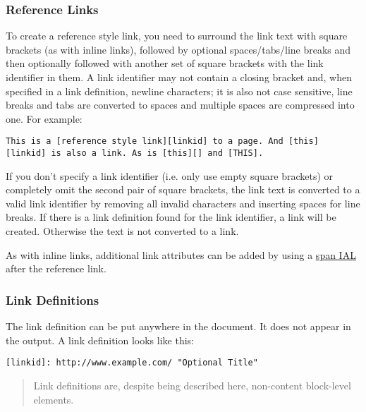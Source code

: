 \documentclass[a4paper]{article}
\begin{document}
\hypertarget{reference-links}{\subsubsection{Reference
Links}\label{reference-links}}

To create a reference style link, you need to surround the link text
with square brackets (as with inline links), followed by optional
spaces/tabs/line breaks and then optionally followed with another set of
square brackets with the link identifier in them. A link identifier may
not contain a closing bracket and, when specified in a link definition,
newline characters; it is also not case sensitive, line breaks and tabs
are converted to spaces and multiple spaces are compressed into one. For
example:

\begin{verbatim}
This is a [reference style link][linkid] to a page. And [this]
[linkid] is also a link. As is [this][] and [THIS].
\end{verbatim}

If you don't specify a link identifier (i.e. only use empty square
brackets) or completely omit the second pair of square brackets, the
link text is converted to a valid link identifier by removing all
invalid characters and inserting spaces for line breaks. If there is a
link definition found for the link identifier, a link will be created.
Otherwise the text is not converted to a link.

As with inline links, additional link attributes can be added by using a
\protect\hyperlink{span-ials}{span IAL} after the reference link.

\hypertarget{link-definitions}{\subsubsection{Link
Definitions}\label{link-definitions}}

The link definition can be put anywhere in the document. It does not
appear in the output. A link definition looks like this:

\begin{verbatim}
[linkid]: http://www.example.com/ "Optional Title"
\end{verbatim}

\begin{quote}
Link definitions are, despite being described here, non-content
block-level elements.
\end{quote}
\end{document}

